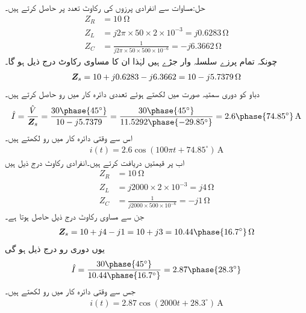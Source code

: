 حل:مساوات  سے انفرادی پرزوں کی رکاوٹ  تعدد پر حاصل کرتے ہیں۔
\begin{align*}
Z_R&=\SI{10}{\ohm}\\
Z_L&=j 2 \pi \times 50 \times 2\times 10^{-3}=j0.6283 \, \si{\ohm}\\
Z_C&=\frac{1}{j 2\pi \times 50 \times 500 \times 10^{-6}}=-j6.3662\, \si{\ohm}
\end{align*}
چونکہ تمام پرزے سلسلہ وار جڑے ہیں لہٰذا ان کا مساوی رکاوٹ درج ذیل ہو گا۔
\begin{align*}
{\ensuremath{{\boldsymbol{Z}}}}_s=10+j0.6283-j6.3662=10-j5.7379 \, \si{\ohm}
\end{align*}
دباو کو دوری سمتیہ صورت میں لکھتے ہوئے تعددی دائرہ کار میں رو حاصل کرتے ہیں۔
\begin{align*}
\hat{I}=\frac{\hat{V}}{\bZ_s}=\frac{30\phase{45^{\circ}}}{10-j5.7379}=\frac{30\phase{45^{\circ}}}{11.5292\phase{-29.85^{\circ}}}=2.6\phase{74.85^{\circ}} \, \si{\ampere}
\end{align*}
اس سے وقتی دائرہ کار میں رو لکھتے ہیں۔
\begin{align*}
i(t)=2.6\cos(100\pi t +74.85^{\circ})\, \si{\ampere}
\end{align*}
اب  پر قیمتیں دریافت کرتے ہیں۔انفرادی رکاوٹ درج ذیل ہیں
\begin{align*}
Z_R&=\SI{10}{\ohm}\\
Z_L&=j 2000\times 2\times 10^{-3}=j4 \, \si{\ohm}\\
Z_C&=\frac{1}{j 2000\times 500 \times 10^{-6}}=-j1\, \si{\ohm}
\end{align*}
جن سے مساوی رکاوٹ درج ذیل حاصل ہوتا ہے۔
\begin{align*}
\bZ_s=10+j4-j1=10+j3=10.44\phase{16.7^{\circ}} \, \si{\ohm}
\end{align*}
یوں دوری رو درج ذیل ہو گی
\begin{align*}
\hat{I}=\frac{30\phase{45^{\circ}}}{10.44\phase{16.7^{\circ}}}=2.87\phase{28.3^{\circ}}
\end{align*}
جس سے وقتی دائرہ کار میں رو لکھتے ہیں۔
\begin{align*}
i(t)=2.87\cos(2000t+28.3^{\circ})\, \si{\ampere}
\end{align*}

